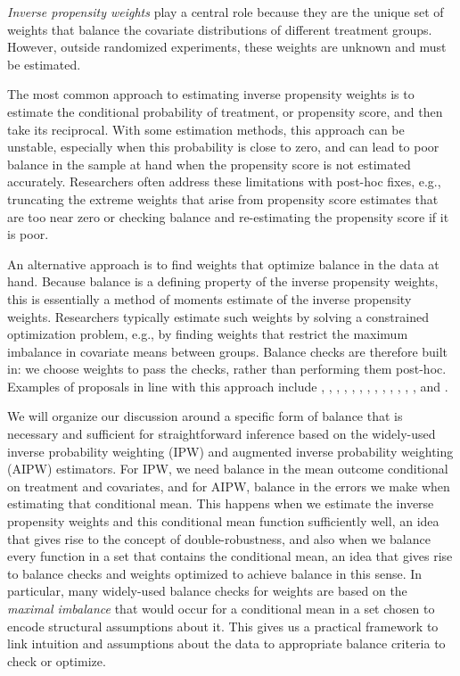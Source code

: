 \documentclass{article}
\theoremstyle{definition}
\newcommand{\<}{\langle}
\renewcommand{\>}{\rangle}
\begin{document}
\emph{Inverse propensity weights} play a central role because they are the unique set of weights that balance the covariate distributions of different treatment groups.
However, outside randomized experiments, these weights are unknown and must be estimated.

The most common approach to estimating inverse propensity weights is to estimate the conditional probability of treatment, or propensity score, and then take its reciprocal.
With some estimation methods, this approach can be unstable, especially when this probability is close to zero, and can lead to poor balance in the sample at hand when the propensity score is not estimated accurately.
Researchers often address these limitations with post-hoc fixes, e.g., truncating the extreme weights that arise from propensity score estimates that are too near zero or checking balance and re-estimating the propensity score if it is poor.

An alternative approach is to find weights that optimize balance in the data at hand.
Because balance is a defining property of the
inverse propensity weights, this is essentially a method of moments estimate of the inverse propensity weights.
Researchers typically estimate such weights by solving a constrained optimization problem, e.g., by finding weights that restrict the maximum imbalance in covariate means between groups.
Balance checks are therefore built in: we choose weights to pass the checks, rather than performing them post-hoc.
Examples of proposals in line with this approach include
\citet{athey2018approximate},
\citet{breidt2017model},
\citet{chan2016globally},
\citet{deville1992calibration},
\citet{graham2012inverse},
\citet{hainmueller2012balancing},
\citet{hirshberg2021augmented},
\citet{imai2014covariate},
\citet{kallus2020generalized},
\citet{li2018balancing},
\citet{tan2020regularized},
\citet{wong2018kernel},
\citet{zhao2019covariate}, and
\citet{zubizarreta2015stable}.

We will organize our discussion around a specific form of balance that is necessary and sufficient for straightforward inference based on the widely-used inverse probability weighting (IPW) and augmented inverse probability weighting (AIPW) estimators. For IPW, we need balance in the mean outcome conditional on treatment and covariates, and for AIPW, balance in the errors we make when estimating that conditional mean.
This happens when we estimate the inverse propensity weights and this conditional mean function sufficiently well, an idea that gives rise to the concept of double-robustness, and also when we balance every function in a set that contains
the conditional mean, an idea that gives rise to balance checks and weights optimized to achieve balance in this sense.
In particular, many widely-used balance checks for weights are based on the \emph{maximal imbalance} that would occur for
a conditional mean in a set chosen to encode structural assumptions about it. %
This gives us a practical framework to link intuition and assumptions about the data to appropriate balance criteria to check or optimize.
\end{document}
